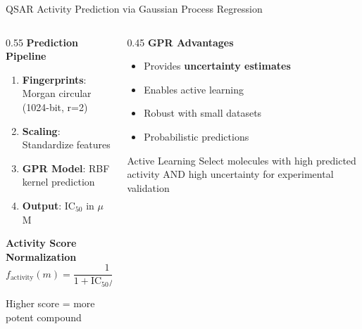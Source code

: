 \documentclass[aspectratio=169,xcolor=table]{beamer}
\begin{document}
\begin{frame}{QSAR Activity Prediction via Gaussian Process Regression}

\begin{columns}
\begin{column}{0.55\textwidth}
\textbf{Prediction Pipeline}
\begin{enumerate}\setlength{\itemsep}{2pt}
    \item \textbf{Fingerprints}: Morgan circular (1024-bit, r=2)
    \item \textbf{Scaling}: Standardize features
    \item \textbf{GPR Model}: RBF kernel prediction
    \item \textbf{Output}: IC$_{50}$ in $\mu$M
\end{enumerate}

\vspace{0.3cm}

\textbf{Activity Score Normalization}
\begin{equation*}
f_{\text{activity}}(m) = \frac{1}{1 + \text{IC}_{50} / 10\,\mu\text{M}}
\end{equation*}

\vspace{0.2cm}
Higher score = more potent compound
\end{column}

\begin{column}{0.45\textwidth}
\textbf{GPR Advantages}
\begin{itemize}\setlength{\itemsep}{2pt}
    \item Provides \textbf{uncertainty estimates}
    \item Enables active learning
    \item Robust with small datasets
    \item Probabilistic predictions
\end{itemize}

\vspace{0.3cm}

\begin{block}{Active Learning}
Select molecules with high predicted activity AND high uncertainty for experimental validation
\end{block}
\end{column}
\end{columns}

\end{frame}
\end{document}
